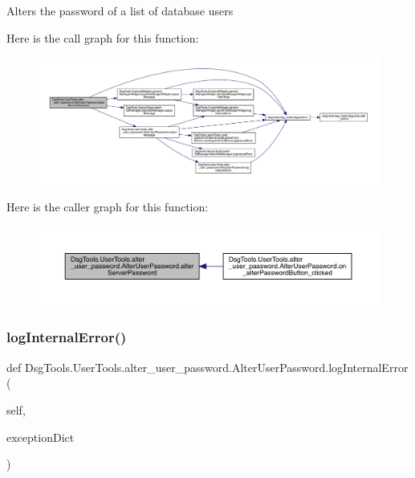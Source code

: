 \begin{DoxyVerb}Alters the password of a list of database users
\end{DoxyVerb}
 Here is the call graph for this function\+:
\nopagebreak
\begin{figure}[H]
\begin{center}
\leavevmode
\includegraphics[width=350pt]{class_dsg_tools_1_1_user_tools_1_1alter__user__password_1_1_alter_user_password_afb5ca38a136f5c87ae6db893dc7bc697_cgraph}
\end{center}
\end{figure}
Here is the caller graph for this function\+:
\nopagebreak
\begin{figure}[H]
\begin{center}
\leavevmode
\includegraphics[width=350pt]{class_dsg_tools_1_1_user_tools_1_1alter__user__password_1_1_alter_user_password_afb5ca38a136f5c87ae6db893dc7bc697_icgraph}
\end{center}
\end{figure}
\mbox{\label{class_dsg_tools_1_1_user_tools_1_1alter__user__password_1_1_alter_user_password_a364b941d46c8a291892bebbd1f462263}} 
\subsubsection{\texorpdfstring{log\+Internal\+Error()}{logInternalError()}}
{\footnotesize\ttfamily def Dsg\+Tools.\+User\+Tools.\+alter\+\_\+user\+\_\+password.\+Alter\+User\+Password.\+log\+Internal\+Error (\begin{DoxyParamCaption}\item[{}]{self,  }\item[{}]{exception\+Dict }\end{DoxyParamCaption})}

